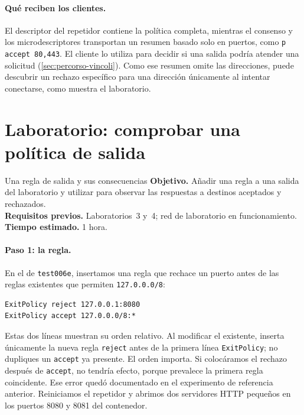 \paragraph{Qué reciben los clientes.} El descriptor del repetidor contiene la política completa, mientras el consenso y los microdescriptores transportan un resumen basado solo en puertos, como \texttt{p accept 80,443}. El cliente lo utiliza para decidir si una salida podría atender una solicitud (\cref{sec:percorso-vincoli}). Como ese resumen omite las direcciones, puede descubrir un rechazo específico para una dirección únicamente al intentar conectarse, como muestra el laboratorio.

\section{Laboratorio: comprobar una política de salida}\label{sec:lab-relay}

\begin{laboratorio}[14]{Una regla de salida y sus consecuencias}
\textbf{Objetivo.} Añadir una regla a una salida del laboratorio y utilizar  para observar las respuestas a destinos aceptados y rechazados.\\
\textbf{Requisitos previos.} Laboratorios~3 y~4; red de laboratorio en funcionamiento.\\
\textbf{Tiempo estimado.} 1 hora.
\end{laboratorio}

\paragraph{Paso 1: la regla.} En el  de \texttt{test006e}, insertamos una regla que rechace un puerto antes de las reglas existentes que permiten \texttt{127.0.0.0/8}:
\begin{lstlisting}[numbers=none]
ExitPolicy reject 127.0.0.1:8080
ExitPolicy accept 127.0.0.0/8:*
\end{lstlisting}
Estas dos líneas muestran su orden relativo. Al modificar el  existente, inserta únicamente la nueva regla \texttt{reject} antes de la primera línea \texttt{ExitPolicy}; no dupliques un \texttt{accept} ya presente. El orden importa. Si colocáramos el rechazo después de \texttt{accept}, no tendría efecto, porque prevalece la primera regla coincidente. Ese error quedó documentado en el experimento de referencia anterior. Reiniciamos el repetidor y abrimos dos servidores HTTP pequeños en los puertos 8080 y 8081 del contenedor.


